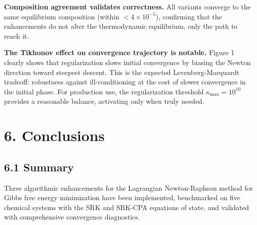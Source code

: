 \documentclass[review,3p]{elsarticle}
\begin{document}
\textbf{Composition agreement validates correctness.} All variants converge to the same equilibrium composition (within $<4 \times 10^{-5}$), confirming that the enhancements do not alter the thermodynamic equilibrium, only the path to reach it.

\textbf{The Tikhonov effect on convergence trajectory is notable.} Figure 1 clearly shows that regularization slows initial convergence by biasing the Newton direction toward steepest descent. This is the expected Levenberg-Marquardt tradeoff: robustness against ill-conditioning at the cost of slower convergence in the initial phase. For production use, the regularization threshold $\kappa_{\max} = 10^{10}$ provides a reasonable balance, activating only when truly needed.


\section{6. Conclusions}



\subsection{6.1 Summary}

Three algorithmic enhancements for the Lagrangian Newton-Raphson method for Gibbs free energy minimization have been implemented, benchmarked on five chemical systems with the SRK and SRK-CPA equations of state, and validated with comprehensive convergence diagnostics.
\end{document}

